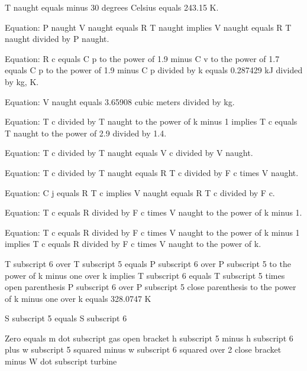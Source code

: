 T naught equals minus 30 degrees Celsius equals 243.15 K.

Equation: P naught V naught equals R T naught implies V naught equals R T naught divided by P naught.

Equation: R c equals C p to the power of 1.9 minus C v to the power of 1.7 equals C p to the power of 1.9 minus C p divided by k equals 0.287429 kJ divided by kg, K.

Equation: V naught equals 3.65908 cubic meters divided by kg.

Equation: T c divided by T naught to the power of k minus 1 implies T c equals T naught to the power of 2.9 divided by 1.4.

Equation: T c divided by T naught equals V c divided by V naught.

Equation: T c divided by T naught equals R T c divided by F c times V naught.

Equation: C j equals R T c implies V naught equals R T c divided by F c.

Equation: T c equals R divided by F c times V naught to the power of k minus 1.

Equation: T c equals R divided by F c times V naught to the power of k minus 1 implies T c equals R divided by F c times V naught to the power of k.

T subscript 6 over T subscript 5 equals P subscript 6 over P subscript 5 to the power of k minus one over k implies T subscript 6 equals T subscript 5 times open parenthesis P subscript 6 over P subscript 5 close parenthesis to the power of k minus one over k equals 328.0747 K

S subscript 5 equals S subscript 6

Zero equals m dot subscript gas open bracket h subscript 5 minus h subscript 6 plus w subscript 5 squared minus w subscript 6 squared over 2 close bracket minus W dot subscript turbine